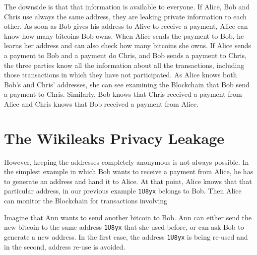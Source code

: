 \documentclass[journal]{IEEEtran}
\begin{document}
The downside is that that information is available to everyone.
If Alice, Bob and Chris use always the same address, they are leaking private information to each other.
As soon as Bob gives his address to Alive to receive a payment, Alice can know how many bitcoins Bob owns.
When Alice sends the payment to Bob, he learns her address and can also check how many bitcoins she owns.
If Alice sends a payment to Bob and a payment do Chris, and Bob sends a payment to Chris, the three parties know all the information about all the transactions, including those transactions in which they have not participated.
As Alice knows both Bob's and Chris' addresses, she can see examining the Blockchain that Bob send a payment to Chris.
Similarly, Bob knows that Chris received a payment from Alice and Chris knows that Bob received a payment from Alice.

\section{The Wikileaks Privacy Leakage}




However, keeping the addresses completely anonymous is not always possible.
In the simplest example in which Bob wants to receive a payment from Alice, he has to generate an address and hand it to Alice.
At that point, Alice knows that that particular address, in our previous example \texttt{1U8yx} belongs to Bob.
Then Alice can monitor the Blockchain for transactions involving



Imagine that Ann wants to send another bitcoin to Bob.
Ann can either send the new bitcoin to the same address \texttt{1U8yx} that she used before, or can ask Bob to generate a new address.
In the first case, the address \texttt{1U8yx} is being re-used and in the second, address re-use is avoided.




\end{document}
